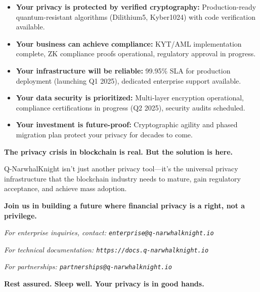 \documentclass[11pt,a4paper]{article}
\begin{document}
\begin{itemize}
    \item \textbf{Your privacy is protected by verified cryptography:} Production-ready quantum-resistant algorithms (Dilithium5, Kyber1024) with code verification available.

    \item \textbf{Your business can achieve compliance:} KYT/AML implementation complete, ZK compliance proofs operational, regulatory approval in progress.

    \item \textbf{Your infrastructure will be reliable:} 99.95\% SLA for production deployment (launching Q1 2025), dedicated enterprise support available.

    \item \textbf{Your data security is prioritized:} Multi-layer encryption operational, compliance certifications in progress (Q2 2025), security audits scheduled.

    \item \textbf{Your investment is future-proof:} Cryptographic agility and phased migration plan protect your privacy for decades to come.
\end{itemize}

\textbf{The privacy crisis in blockchain is real. But the solution is here.}

Q-NarwhalKnight isn't just another privacy tool—it's the universal privacy infrastructure that the blockchain industry needs to mature, gain regulatory acceptance, and achieve mass adoption.

\textbf{Join us in building a future where financial privacy is a right, not a privilege.}

\vspace{1cm}

\textit{For enterprise inquiries, contact: \texttt{enterprise@q-narwhalknight.io}}

\textit{For technical documentation: \texttt{https://docs.q-narwhalknight.io}}

\textit{For partnerships: \texttt{partnerships@q-narwhalknight.io}}

\vspace{0.5cm}

\textbf{Rest assured. Sleep well. Your privacy is in good hands.}
\end{document}
